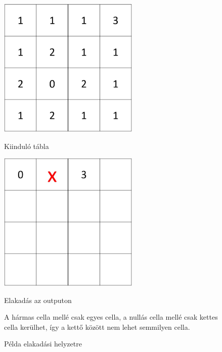 \begin{figure}
\centering
\begin{minipage}{.5\textwidth}
  \centering
  \includegraphics[width=190pt]{images/reference-table.jpg}
  \caption*{Kiinduló tábla}
\end{minipage}%
\begin{minipage}{.5\textwidth}
  \centering
  \includegraphics[width=190pt]{images/Invalid.jpg}
  \caption*{Elakadás az outputon}
\end{minipage}
\caption{Példa elakadási helyzetre}
  A hármas cella mellé csak egyes cella, a nullás cella mellé csak kettes cella kerülhet, így a kettő között nem lehet semmilyen cella.
\label{fig:elakadas}
\end{figure}

\newpage

